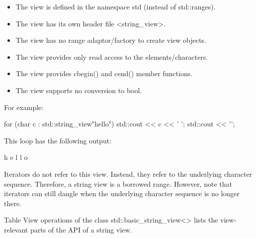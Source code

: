 \begin{itemize}
\item
The view is defined in the namespace std (instead of std::ranges).

\item
The view has its own header file <string\_view>.

\item
The view has no range adaptor/factory to create view objects.

\item
The view provides only read access to the elements/characters.

\item
The view provides cbegin() and cend() member functions.

\item
The view supports no conversion to bool.
\end{itemize}

For example:

\begin{cpp}
for (char c : std::string_view{"hello"}) {
	std::cout << c << ' ';
}
std::cout << '\n';
\end{cpp}

This loop has the following output:

\begin{shell}
h e l l o
\end{shell}


Iterators do not refer to this view. Instead, they refer to the underlying character sequence. Therefore, a string view is a borrowed range. However, note that iterators can still dangle when the underlying character sequence is no longer there.


Table View operations of the class std::basic\_string\_view<> lists the view-relevant parts of the API of a string view.

